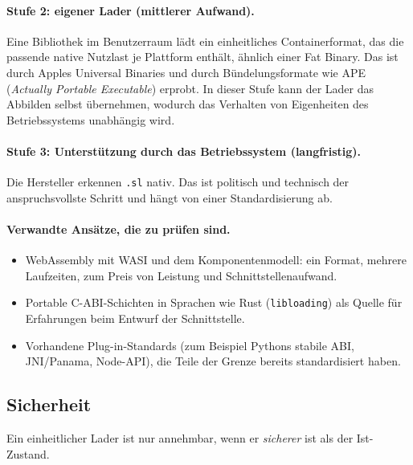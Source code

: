 \paragraph{Stufe 2: eigener Lader (mittlerer Aufwand).} Eine Bibliothek im Benutzerraum lädt ein einheitliches Containerformat, das die passende native Nutzlast je Plattform enthält, ähnlich einer Fat Binary. Das ist durch Apples Universal Binaries und durch Bündelungsformate wie APE (\emph{Actually Portable Executable}) erprobt. In dieser Stufe kann der Lader das Abbilden selbst übernehmen, wodurch das Verhalten von Eigenheiten des Betriebssystems unabhängig wird.

\paragraph{Stufe 3: Unterstützung durch das Betriebssystem (langfristig).} Die Hersteller erkennen \texttt{.sl} nativ. Das ist politisch und technisch der anspruchsvollste Schritt und hängt von einer Standardisierung ab.

\paragraph{Verwandte Ansätze, die zu prüfen sind.}

\begin{itemize}
	\item WebAssembly mit WASI und dem Komponentenmodell: ein Format, mehrere Laufzeiten, zum Preis von Leistung und Schnittstellenaufwand.
	\item Portable C-ABI-Schichten in Sprachen wie Rust (\texttt{libloading}) als Quelle für Erfahrungen beim Entwurf der Schnittstelle.
	\item Vorhandene Plug-in-Standards (zum Beispiel Pythons stabile ABI, JNI/Panama, Node-API), die Teile der Grenze bereits standardisiert haben.
\end{itemize}

\subsection{Sicherheit}
\label{sec:sl_sicherheit}

Ein einheitlicher Lader ist nur annehmbar, wenn er \emph{sicherer} ist als der Ist-Zustand.

